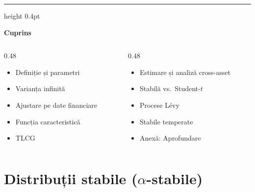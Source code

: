 \documentclass[9pt, aspectratio=169, t]{beamer}
\theoremstyle{definition}
\begin{document}
{
\begin{frame}{}
    {\color{FooterGray}\hrule height 0.4pt}
    \vspace{0.1cm}
    {\Large\textcolor{IDAred}{\textbf{Cuprins}}}
    \vspace{0.2cm}
    {\small
    \begin{columns}[T]
        \begin{column}{0.48\textwidth}
            \begin{itemize}
                \item Definiție și parametri
                \item Varianța infinită
                \item Ajustare pe date financiare
                \item Funcția caracteristică
                \item TLCG
            \end{itemize}
        \end{column}
        \begin{column}{0.48\textwidth}
            \begin{itemize}
                \item Estimare și analiză cross-asset
                \item Stabilă vs.\ Student-$t$
                \item Procese L\'{e}vy
                \item Stabile temperate
                \item Anexă: Aprofundare
            \end{itemize}
        \end{column}
    \end{columns}
    }
\end{frame}
}

\section{Distribuții stabile ($\alpha$-stabile)}
\end{document}
